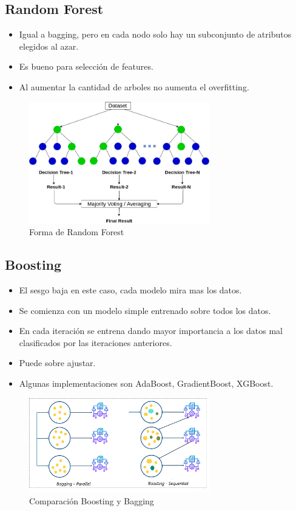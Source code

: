 \documentclass[titlepage,a4paper]{article}
\begin{document}
\subsection{Random Forest}

\begin{itemize}
    \item Igual a bagging, pero en cada nodo solo hay un subconjunto de atributos elegidos al azar.
    \item Es bueno para selección de features.
    \item Al aumentar la cantidad de arboles no aumenta el overfitting.
\end{itemize}

\begin{figure}[!htb]
    \centering
    \includegraphics[width=0.7\textwidth]{imagenesResumen/RandomForest.png}
    \caption{Forma de Random Forest}
\end{figure}


\subsection{Boosting}
\begin{itemize}
    \item El sesgo baja en este caso, cada modelo mira mas los datos.
    \item Se comienza con un modelo simple entrenado sobre todos los datos.
    \item En cada iteración se entrena dando mayor importancia a los datos mal clasificados por las iteraciones anteriores.
    \item Puede sobre ajustar.
    \item Algunas implementaciones son AdaBoost, GradientBoost, XGBoost.
\end{itemize}

\begin{figure}[!htb]
    \centering
    \includegraphics[width=0.7\textwidth]{imagenesResumen/Boosting.png}
    \caption{Comparación Boosting y Bagging}
\end{figure}
\end{document}
